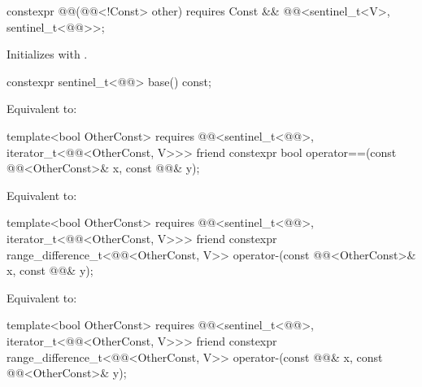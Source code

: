 %
\begin{itemdecl}
constexpr @@(@@<!Const> other)
  requires Const && @@<sentinel_t<V>, sentinel_t<@@>>;
\end{itemdecl}

\begin{itemdescr}
\pnum
\effects
Initializes  with .
\end{itemdescr}

%
\begin{itemdecl}
constexpr sentinel_t<@@> base() const;
\end{itemdecl}

\begin{itemdescr}
\pnum
\effects
Equivalent to: 
\end{itemdescr}

%
\begin{itemdecl}
template<bool OtherConst>
  requires @@<sentinel_t<@@>, iterator_t<@@<OtherConst, V>>>
friend constexpr bool operator==(const @@<OtherConst>& x, const @@& y);
\end{itemdecl}

\begin{itemdescr}
\pnum
\effects
Equivalent to: 
\end{itemdescr}

%
\begin{itemdecl}
template<bool OtherConst>
  requires @@<sentinel_t<@@>, iterator_t<@@<OtherConst, V>>>
friend constexpr range_difference_t<@@<OtherConst, V>>
  operator-(const @@<OtherConst>& x, const @@& y);
\end{itemdecl}

\begin{itemdescr}
\pnum
\effects
Equivalent to: 
\end{itemdescr}

%
\begin{itemdecl}
template<bool OtherConst>
  requires @@<sentinel_t<@@>, iterator_t<@@<OtherConst, V>>>
friend constexpr range_difference_t<@@<OtherConst, V>>
  operator-(const @@& x, const @@<OtherConst>& y);
\end{itemdecl}

